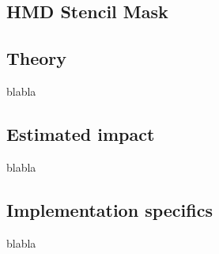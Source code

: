 
\subsection{HMD Stencil Mask}
\subsection{Theory}
blabla
\subsection{Estimated impact}
blabla
\subsection{Implementation specifics}
blabla
